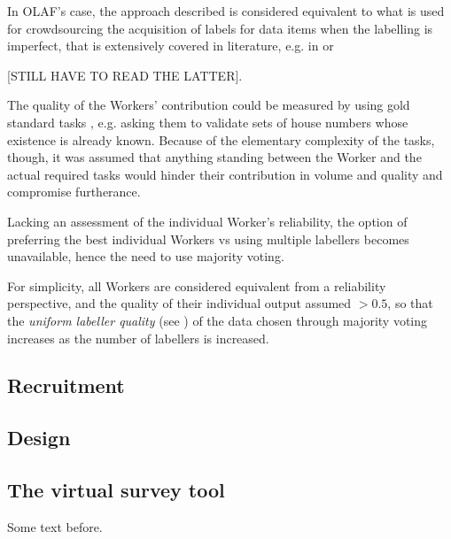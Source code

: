 \documentclass{llncs}
\begin{document}
    In OLAF's case, the approach described is considered equivalent to what is used for crowdsourcing the acquisition of labels for data items when the labelling is imperfect, that is extensively covered in literature, e.g. in \cite{sheng2008get} or \cite{Welinder:2010vkb}{[STILL HAVE TO READ THE LATTER{]}. 
    
    The quality of the Workers' contribution could be measured by using gold standard tasks \cite{Oleson:2011tx}, e.g. asking them to validate sets of house numbers whose existence is already known. Because of the elementary complexity of the tasks, though, it was assumed that anything standing between the Worker and the actual required tasks would hinder their contribution in volume and quality and compromise furtherance.
    
    Lacking an assessment of the individual Worker's reliability, the option of preferring the best individual Workers vs using multiple labellers becomes unavailable, hence the need to use majority voting. 
    
    For simplicity, all Workers are considered equivalent from a reliability perspective, and the quality of their individual output assumed $ > 0.5 $, so that the \textit{uniform labeller quality} (see \cite{sheng2008get}) of the data chosen through majority voting increases as the number of labellers is increased.

\subsection{Recruitment}
\subsection{Design}
\subsection{The virtual survey tool}

    Some text before.
    
}
\end{document}
